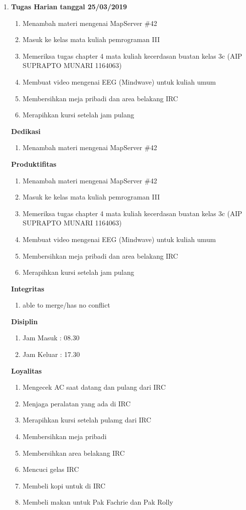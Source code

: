 \begin{enumerate}
\item \textbf{Tugas Harian tanggal 25/03/2019}
\begin{enumerate}
\item Menambah materi mengenai MapServer \#42
\item Masuk ke kelas mata kuliah pemrograman III
\item Memeriksa  tugas chapter 4 mata kuliah kecerdasan buatan kelas 3c (AIP SUPRAPTO MUNARI 1164063)
\item Membuat video mengenai EEG (Mindwave) untuk kuliah umum
\item Membersihkan meja pribadi dan area belakang IRC
\item Merapihkan kursi setelah jam pulang 
\end{enumerate}

\textbf{Dedikasi}
\begin{enumerate}
\item Menambah materi mengenai MapServer \#42
\end{enumerate}

\textbf{Produktifitas}
\begin{enumerate}
\item Menambah materi mengenai MapServer \#42
\item Masuk ke kelas mata kuliah pemrograman III
\item Memeriksa  tugas chapter 4 mata kuliah kecerdasan buatan kelas 3c (AIP SUPRAPTO MUNARI 1164063)
\item Membuat video mengenai EEG (Mindwave) untuk kuliah umum
\item Membersihkan meja pribadi dan area belakang IRC
\item Merapihkan kursi setelah jam pulang 
\end{enumerate}

\textbf{Integritas}
\begin{enumerate}
\item able to merge/has no conflict
\end{enumerate}

\textbf{Disiplin}
\begin{enumerate}
\item Jam Masuk : 08.30
\item Jam Keluar : 17.30
\end{enumerate}

\textbf{Loyalitas}
\begin{enumerate}
\item Mengecek AC saat datang dan pulang dari IRC
\item Menjaga peralatan yang ada di IRC
\item Merapihkan kursi setelah pulamg dari IRC
\item Membersihkan meja pribadi
\item Membersihkan area belakang IRC
\item Mencuci gelas IRC
\item Membeli kopi untuk di IRC
\item Membeli makan untuk Pak Fachrie dan Pak Rolly
\end{enumerate}



\end{enumerate}
